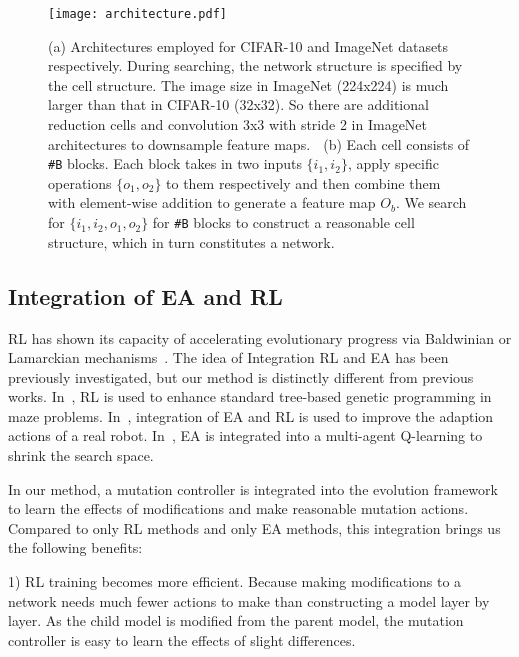 \documentclass[10pt,twocolumn,letterpaper]{article}
\begin{document}
 \begin{figure*}[ht]
  \centering
  \texttt{[image: architecture.pdf]}
  \caption{(a) Architectures employed for CIFAR-10 and ImageNet datasets respectively. During searching, the network structure is specified by the cell structure. 
The image size in ImageNet (224x224) is much larger than that in CIFAR-10 (32x32). So there are additional reduction cells and convolution 3x3 with stride 2 in ImageNet architectures to downsample feature maps.  %
   $\;$
  (b) Each cell consists of \texttt{\#B} blocks. Each block takes in two inputs $\{i_1,i_2\}$, apply specific operations $\{o_1,o_2\}$ to them respectively and then combine them with element-wise addition to generate a feature map $O_b$. We search for $\{i_1,i_2,o_1,o_2\}$ for \texttt{\#B} blocks to construct a reasonable cell structure, which in turn constitutes a network.}\label{fig:2}
\end{figure*}

\subsection{Integration of EA and RL}
RL has shown its capacity of accelerating evolutionary progress via Baldwinian or Lamarckian mechanisms~\cite{downing2001adaptive}.
The idea of Integration RL and EA has been previously investigated, but our method is distinctly different from previous works.
In~\cite{DBLP:journals/gpem/Downing01}, RL is used to enhance standard tree-based genetic programming in maze problems. In~\cite{kamio2005adaptation}, integration of EA and RL is used to improve the adaption actions of a real robot. In~\cite{hitoshi1998multi}, EA is integrated into a multi-agent Q-learning to shrink the search space. %

In our method, a mutation controller is integrated into the evolution framework to learn the effects of modifications and make reasonable mutation actions. Compared to only RL methods and only EA methods, this integration brings us the following benefits:

1) RL training becomes more efficient. Because making modifications to a network needs much fewer actions to make than constructing a model layer by layer.  As the child model is modified from the parent model, the mutation controller is easy to learn the effects of slight differences.
\end{document}
